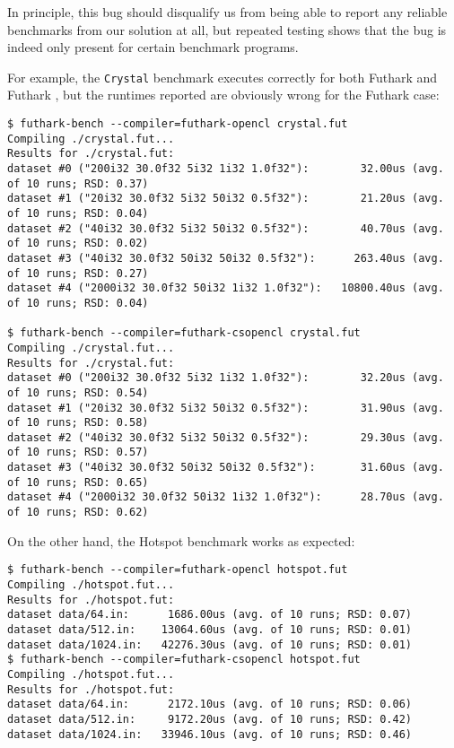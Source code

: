 In principle, this bug should disqualify us from being able to report any
reliable benchmarks from our solution at all, but repeated testing shows that
the bug is indeed only present for certain benchmark programs.

For example, the \texttt{Crystal} benchmark executes correctly for both Futhark
\clang{} and Futhark \csharp{}, but the runtimes reported are obviously
wrong for the Futhark \csharp{} case:

\begin{verbatim}
$ futhark-bench --compiler=futhark-opencl crystal.fut
Compiling ./crystal.fut...
Results for ./crystal.fut:
dataset #0 ("200i32 30.0f32 5i32 1i32 1.0f32"):        32.00us (avg. of 10 runs; RSD: 0.37)
dataset #1 ("20i32 30.0f32 5i32 50i32 0.5f32"):        21.20us (avg. of 10 runs; RSD: 0.04)
dataset #2 ("40i32 30.0f32 5i32 50i32 0.5f32"):        40.70us (avg. of 10 runs; RSD: 0.02)
dataset #3 ("40i32 30.0f32 50i32 50i32 0.5f32"):      263.40us (avg. of 10 runs; RSD: 0.27)
dataset #4 ("2000i32 30.0f32 50i32 1i32 1.0f32"):   10800.40us (avg. of 10 runs; RSD: 0.04)

$ futhark-bench --compiler=futhark-csopencl crystal.fut
Compiling ./crystal.fut...
Results for ./crystal.fut:
dataset #0 ("200i32 30.0f32 5i32 1i32 1.0f32"):        32.20us (avg. of 10 runs; RSD: 0.54)
dataset #1 ("20i32 30.0f32 5i32 50i32 0.5f32"):        31.90us (avg. of 10 runs; RSD: 0.58)
dataset #2 ("40i32 30.0f32 5i32 50i32 0.5f32"):        29.30us (avg. of 10 runs; RSD: 0.57)
dataset #3 ("40i32 30.0f32 50i32 50i32 0.5f32"):       31.60us (avg. of 10 runs; RSD: 0.65)
dataset #4 ("2000i32 30.0f32 50i32 1i32 1.0f32"):      28.70us (avg. of 10 runs; RSD: 0.62)
\end{verbatim}

On the other hand, the Hotspot benchmark works as expected:
\begin{verbatim}
$ futhark-bench --compiler=futhark-opencl hotspot.fut  
Compiling ./hotspot.fut...
Results for ./hotspot.fut:
dataset data/64.in:      1686.00us (avg. of 10 runs; RSD: 0.07)
dataset data/512.in:    13064.60us (avg. of 10 runs; RSD: 0.01)
dataset data/1024.in:   42276.30us (avg. of 10 runs; RSD: 0.01)
$ futhark-bench --compiler=futhark-csopencl hotspot.fut
Compiling ./hotspot.fut...
Results for ./hotspot.fut:
dataset data/64.in:      2172.10us (avg. of 10 runs; RSD: 0.06)
dataset data/512.in:     9172.20us (avg. of 10 runs; RSD: 0.42)
dataset data/1024.in:   33946.10us (avg. of 10 runs; RSD: 0.46)
\end{verbatim}





